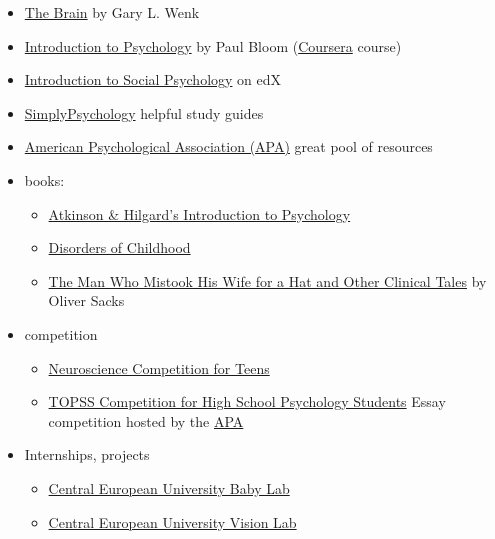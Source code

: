 \documentclass{article}
\begin{document}
\begin{itemize}
    \item \href{https://www.goodreads.com/book/show/34107392-the-brain}{The Brain} by Gary L. Wenk
    \item \href{https://www.youtube.com/playlist?list=PL6A08EB4EEFF3E91F}{Introduction to Psychology} by Paul Bloom (\href{https://www.coursera.org/learn/introduction-psychology}{Coursera} course)
    \item \href{https://www.edx.org/course/introduction-to-social-psychology}{Introduction to Social Psychology} on edX
    \item \href{https://www.simplypsychology.org/}{SimplyPsychology} helpful study guides
    \item \href{https://www.apa.org/research}{American Psychological Association (APA)} great pool of resources
   \item books:
   \begin{itemize}
        \item \href{https://www.goodreads.com/book/show/6896497-atkinson-hilgard-s-introduction-to-psychology}{Atkinson \& Hilgard's Introduction to Psychology}
       \item \href{https://www.goodreads.com/en/book/show/16242266-disorders-of-childhood}{Disorders of Childhood}
       \item \href{https://www.goodreads.com/book/show/63697.The_Man_Who_Mistook_His_Wife_for_a_Hat_and_Other_Clinical_Tales}{The Man Who Mistook His Wife for a Hat and Other Clinical Tales} by Oliver Sacks
   \end{itemize}
   \item competition
   \begin{itemize}
       \item \href{https://thebrainbee.org/}{Neuroscience Competition for Teens}
       \item \href{https://www.apa.org/ed/precollege/topss/student-competition}{TOPSS Competition for High School Psychology Students} Essay competition hosted by the \href{https://www.apa.org/}{APA}
   \end{itemize}
    \item Internships, projects
    \begin{itemize}
        \item \href{https://cognitivescience.ceu.edu/unit/baby-lab}{Central European University Baby Lab}
        \item \href{https://www.visionlab-ceu.org/}{Central European University Vision Lab}
    \end{itemize}
\end{itemize}
\end{document}
